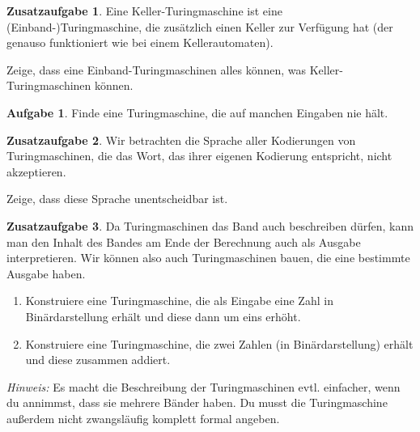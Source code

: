 \documentclass[a4paper,ngerman,12pt]{scrartcl}
\theoremstyle{definition}
\newtheorem{aufg}{Aufgabe}
\newtheorem{zaufg}{Zusatzaufgabe}
\theoremstyle{plain}
\theoremstyle{remark}
\begin{document}
\begin{zaufg}
	Eine Keller-Turingmaschine ist eine (Einband-)Turingmaschine, die zusätzlich einen Keller zur Verfügung hat (der genauso funktioniert wie bei einem Kellerautomaten).
	
	Zeige, dass eine Einband-Turingmaschinen alles können, was Keller-Turingmaschinen können.
\end{zaufg}

\begin{aufg}
	Finde eine Turingmaschine, die auf manchen Eingaben nie hält.
\end{aufg}

\begin{zaufg}
	Wir betrachten die Sprache aller Kodierungen von Turingmaschinen, die das Wort, das ihrer eigenen Kodierung entspricht, nicht akzeptieren.
	
	Zeige, dass diese Sprache unentscheidbar ist.
\end{zaufg}

\begin{zaufg}
	Da Turingmaschinen das Band auch beschreiben dürfen, kann man den Inhalt des Bandes am Ende der Berechnung auch als Ausgabe interpretieren. Wir können also auch Turingmaschinen bauen, die eine bestimmte Ausgabe haben.
	\begin{enumerate}[label=\alph*)]
		\item Konstruiere eine Turingmaschine, die als Eingabe eine Zahl in Binärdarstellung erhält und diese dann um eins erhöht.
		\item Konstruiere eine Turingmaschine, die zwei Zahlen (in Binärdarstellung) erhält und diese zusammen addiert.
	\end{enumerate}
	\textit{Hinweis:} Es macht die Beschreibung der Turingmaschinen evtl. einfacher, wenn du annimmst, dass sie mehrere Bänder haben. Du musst die Turingmaschine außerdem nicht zwangsläufig komplett formal angeben.
\end{zaufg}
\end{document}
